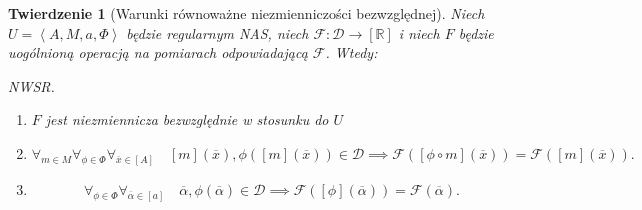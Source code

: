 \documentclass[12pt,a4paper]{report}
\newtheorem{tw}[definition]{Twierdzenie}
\newcommand{\domkniecie}[1]{\left\lbrack{#1}\right\rbrack}
\newcommand{\tuple}[1]{\left\langle {#1} \right\rangle}
\begin{document}
\begin{tw}[Warunki równoważne niezmienniczości bezwzględnej]
Niech $U=\tuple{A,M,a,\Phi}$ będzie regularnym NAS, niech $\mathcal{F}:\mathcal{D}\to \domkniecie{\mathbb{R}}$ i niech $F$ będzie uogólnioną operacją na pomiarach odpowiadającą $\mathcal{F}$. Wtedy:

\item
NWSR.
\begin{enumerate}
\item
$F$ jest niezmiennicza bezwzględnie w stosunku do $U$ 
\item
$$
\forall_{m \in M}\forall_{\phi \in \Phi} \forall_{\overline{x} \in \domkniecie{A}} \quad \domkniecie{m}(\overline{x}),\phi(\domkniecie{m}(\overline{x})) \in \mathcal{D} \implies \mathcal{F}( \domkniecie{\phi \circ m}(\overline{x}))=\mathcal{F}(\domkniecie{m}(\overline{x})).
$$
\item
$$
\forall_{\phi \in \Phi} \forall_{\overline{\alpha} \in \domkniecie{a}} \quad \overline{\alpha}, \phi(\overline{\alpha})\in \mathcal{D} \implies \mathcal{F}(\domkniecie{\phi}(\overline{\alpha}))=\mathcal{F}(\overline{\alpha}).
$$
\end{enumerate}

\end{tw}
\end{document}
